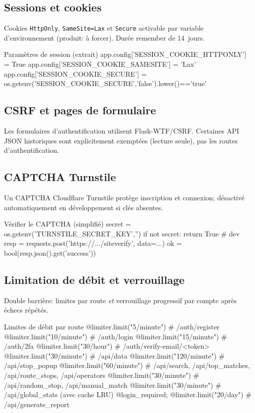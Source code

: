 \subsection*{Sessions et cookies}
\noindent Cookies \texttt{HttpOnly}, \texttt{SameSite=Lax} et \texttt{Secure} activable par variable d'environnement (produit: à forcer). Durée \og remember \fg{} de 14~jours.
\begin{codebox}[language=Python]{Paramètres de session (extrait)}
app.config['SESSION_COOKIE_HTTPONLY'] = True
app.config['SESSION_COOKIE_SAMESITE'] = 'Lax'
app.config['SESSION_COOKIE_SECURE'] = os.getenv('SESSION_COOKIE_SECURE','false').lower()=='true'
\end{codebox}

\subsection*{CSRF et pages de formulaire}
\noindent Les formulaires d'authentification utilisent Flask-WTF/CSRF. Certaines API JSON historiques sont explicitement exemptées (lecture seule), pas les routes d'authentification.

\subsection*{CAPTCHA Turnstile}
\noindent Un CAPTCHA Cloudflare Turnstile protège inscription et connexion; désactivé automatiquement en développement si clés absentes.
\begin{codebox}[language=Python]{Vérifier le CAPTCHA (simplifié)}
secret = os.getenv('TURNSTILE_SECRET_KEY','')
if not secret: return True  # dev
resp = requests.post('https://.../siteverify', data={...})
ok = bool(resp.json().get('success'))
\end{codebox}

\subsection*{Limitation de débit et verrouillage}
\noindent Double barrière: limites par route \emph{et} verrouillage progressif par compte après échecs répétés.
\begin{codebox}[language=Python]{Limites de débit par route}
@limiter.limit("5/minute")   # /auth/register
@limiter.limit("10/minute")  # /auth/login
@limiter.limit("15/minute")  # /auth/2fa
@limiter.limit("30/hour")    # /auth/verify-email/<token>
@limiter.limit("30/minute")  # /api/data
@limiter.limit("120/minute") # /api/stop_popup
@limiter.limit("60/minute")  # /api/search, /api/top_matches, /api/route_stops, /api/operators
@limiter.limit("30/minute")  # /api/random_stop, /api/manual_match
@limiter.limit("30/minute")  # /api/global_stats (avec cache LRU)
@login_required; @limiter.limit("20/day")  # /api/generate_report
\end{codebox}

